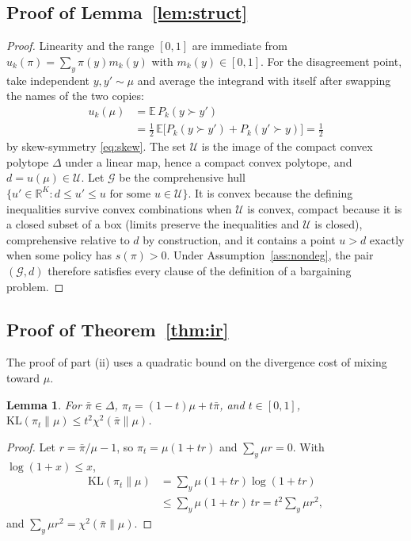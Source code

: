 \documentclass[letterpaper]{article} %
\newtheorem{lemma}{Lemma}
\newcommand{\G}{\mathcal{G}}
\newcommand{\U}{\mathcal{U}}
\newcommand{\KL}{\mathrm{KL}}
\newcommand{\E}{\mathbb{E}}
\newcommand{\R}{\mathbb{R}}
\begin{document}
\subsection{Proof of Lemma~\ref{lem:struct}}
\begin{proof}
Linearity and the range $[0,1]$ are immediate from $u_k(\pi)=\sum_y\pi(y)m_k(y)$ with $m_k(y)\in[0,1]$. For the disagreement point, take independent $y,y'\sim\mu$ and average the integrand with itself after swapping the names of the two copies:
\[
\begin{aligned}
u_k(\mu)&=\E\,P_k(y\succ y')\\
&=\tfrac12\,\E\big[P_k(y\succ y')+P_k(y'\succ y)\big]=\tfrac12
\end{aligned}
\]
by skew-symmetry \eqref{eq:skew}. The set $\U$ is the image of the compact convex polytope $\Delta$ under a linear map, hence a compact convex polytope, and $d=u(\mu)\in\U$. Let $\G$ be the comprehensive hull $\{u'\in\R^K:d\le u'\le u\text{ for some }u\in\U\}$. It is convex because the defining inequalities survive convex combinations when $\U$ is convex, compact because it is a closed subset of a box (limits preserve the inequalities and $\U$ is closed), comprehensive relative to $d$ by construction, and it contains a point $u>d$ exactly when some policy has $s(\pi)>0$. Under Assumption~\ref{ass:nondeg}, the pair $(\G,d)$ therefore satisfies every clause of the definition of a bargaining problem.
\end{proof}

\subsection{Proof of Theorem~\ref{thm:ir}}
The proof of part (ii) uses a quadratic bound on the divergence cost of mixing toward $\mu$.
\begin{lemma}\label{lem:mix}
For $\bar\pi\in\Delta$, $\pi_t=(1-t)\mu+t\bar\pi$, and $t\in[0,1]$,
$\KL(\pi_t\|\mu)\le t^2\chi^2(\bar\pi\|\mu)$.
\end{lemma}
\begin{proof}
Let $r=\bar\pi/\mu-1$, so $\pi_t=\mu(1+tr)$ and $\sum_y\mu r=0$. With $\log(1+x)\le x$,
\[
\begin{aligned}
\KL(\pi_t\|\mu)&=\sum_y\mu(1+tr)\log(1+tr)\\
&\le\sum_y\mu(1+tr)\,tr=t^2\sum_y\mu r^2,
\end{aligned}
\]
and $\sum_y\mu r^2=\chi^2(\bar\pi\|\mu)$.
\end{proof}
\end{document}
